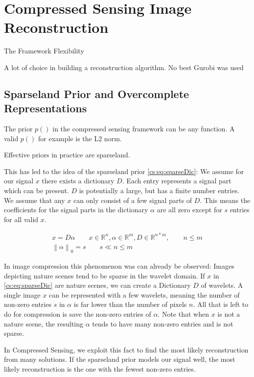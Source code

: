\section{Compressed Sensing Image Reconstruction} \label{cs}

The Framework Flexibility

A lot of choice in building a reconstruction algorithm. No best
Gurobi\cite{gurobi2018optimizer} was used


\subsection{Sparseland Prior and Overcomplete Representations}
The prior $p()$ in the compressed sensing framework can be any function. A valid $p()$ for example is the L2 norm.

Effective priors in practice are sparseland.

This has led to the idea of the sparseland prior \eqref{cs:eq:sparseDic}: We assume for our signal $x$ there exists a dictionary $D$. Each entry represents a signal part which can be present. $D$ is potentially a large, but has a finite number entries. We assume that any $x$ can only consist of a few signal parts of $D$. This means the coefficients for the signal parts in the dictionary $\alpha$ are all zero except for $s$ entries for all valid $x$. 

\begin{equation} \label{cs:eq:sparseDic}
\begin{split}
x = D \alpha  \qquad  x \in \mathbb{R}^{n}, \alpha \in \mathbb{R}^{m}, D \in \mathbb{R}^{n*m}, \qquad n \leq m \\
\left \| \alpha \right \|_0 = s \qquad s \ll n \leq m
\end{split}
\end{equation}

In image compression this phenomenon was can already be observed: Images depicting nature scenes tend to be sparse in the wavelet domain. If $x$ in \eqref{cs:eq:sparseDic} are nature scenes, we can create a Dictionary $D$ of wavelets. A single image $x$ can be represented with a few wavelets, meaning the number of non-zero entries $s$ in $\alpha$ is far lower than the number of pixels $n$. All that is left to do for compression is save the non-zero entries of $\alpha$. Note that when $x$ is not a nature scene, the resulting $\alpha$ tends to have many non-zero entries and is not sparse. 

In Compressed Sensing, we exploit this fact to find the most likely reconstruction from many solutions. If the sparseland prior models our signal well, the most likely reconstruction is the one with the fewest non-zero entries.

